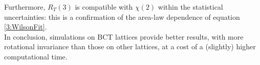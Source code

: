 Furthermore, $R_T(3)$ is compatible with $\chi(2)$ within the statistical uncertainties: this is a confirmation of the area-law dependence of equation \eqref{3:WilsonFit}.\\
In conclusion, simulations on BCT lattices provide better results, with more rotational invariance than those on other lattices, at a cost of a (slightly) higher computational time.
